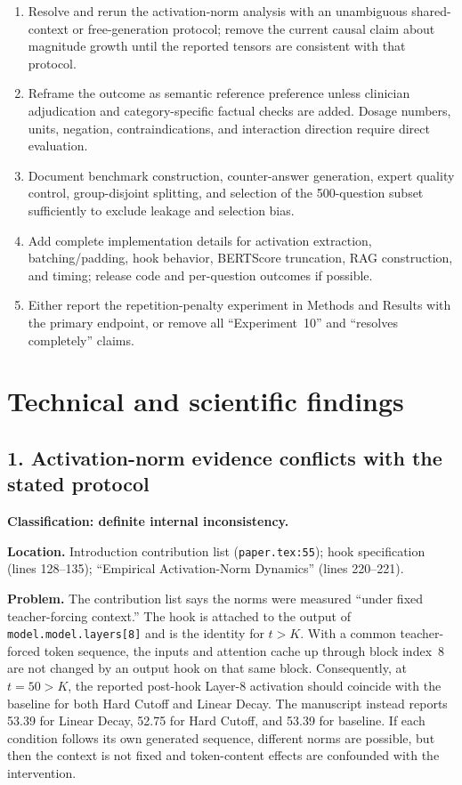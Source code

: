\documentclass[11pt]{article}
\newcommand{\status}[1]{\textbf{#1}}
\begin{document}
\begin{enumerate}
    \item Resolve and rerun the activation-norm analysis with an unambiguous shared-context or free-generation protocol; remove the current causal claim about magnitude growth until the reported tensors are consistent with that protocol.
    \item Reframe the outcome as semantic reference preference unless clinician adjudication and category-specific factual checks are added.  Dosage numbers, units, negation, contraindications, and interaction direction require direct evaluation.
    \item Document benchmark construction, counter-answer generation, expert quality control, group-disjoint splitting, and selection of the 500-question subset sufficiently to exclude leakage and selection bias.
    \item Add complete implementation details for activation extraction, batching/padding, hook behavior, BERTScore truncation, RAG construction, and timing; release code and per-question outcomes if possible.
    \item Either report the repetition-penalty experiment in Methods and Results with the primary endpoint, or remove all ``Experiment~10'' and ``resolves completely'' claims.
\end{enumerate}

\section*{Technical and scientific findings}

\subsection*{1. Activation-norm evidence conflicts with the stated protocol}

\status{Classification: definite internal inconsistency.}

\status{Location.} Introduction contribution list (\texttt{paper.tex:55}); hook specification (lines 128--135); ``Empirical Activation-Norm Dynamics'' (lines 220--221).

\status{Problem.} The contribution list says the norms were measured ``under fixed teacher-forcing context.''  The hook is attached to the output of \texttt{model.model.layers[8]} and is the identity for $t>K$.  With a common teacher-forced token sequence, the inputs and attention cache up through block index~8 are not changed by an output hook on that same block.  Consequently, at $t=50>K$, the reported post-hook Layer-8 activation should coincide with the baseline for both Hard Cutoff and Linear Decay.  The manuscript instead reports 53.39 for Linear Decay, 52.75 for Hard Cutoff, and 53.39 for baseline.  If each condition follows its own generated sequence, different norms are possible, but then the context is not fixed and token-content effects are confounded with the intervention.
\end{document}
